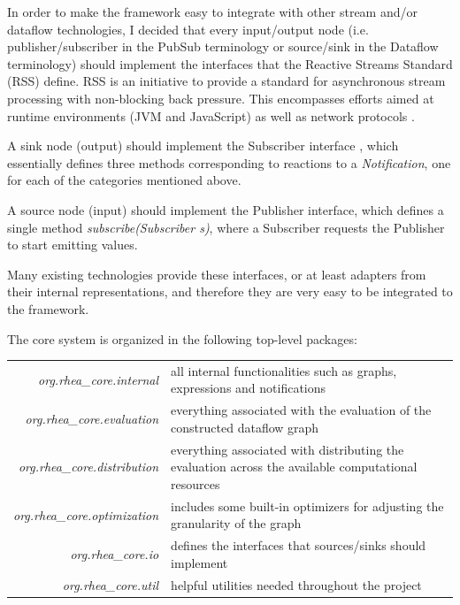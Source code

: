 \documentclass{dithesis}
\begin{document}
In order to make the framework easy to integrate with other stream and/or dataflow technologies, I decided that every input/output node (i.e. publisher/subscriber in the PubSub terminology or source/sink in the Dataflow terminology) should implement the interfaces that the Reactive Streams Standard (RSS) define. RSS is an initiative to provide a standard for asynchronous stream processing with non-blocking back pressure. This encompasses efforts aimed at runtime environments (JVM and JavaScript) as well as network protocols \cite{rss}.

A sink node (output) should implement the Subscriber interface , which essentially defines three methods corresponding to reactions to a \textit{Notification}, one for each of the categories mentioned above. 

A source node (input) should implement the Publisher interface, which defines a single method \textit{subscribe(Subscriber s)}, where a Subscriber requests the Publisher to start emitting values. 

Many existing technologies provide these interfaces, or at least adapters from their internal representations, and therefore they are very easy to be integrated to the framework.

\newpage

The core system is organized in the following top-level packages:

\begin{tabularx}{\textwidth}{rX}
	\textit{org.rhea\_core.internal} 
	& all internal functionalities such as graphs, expressions and notifications \\
	\textit{org.rhea\_core.evaluation}
	& everything associated with the evaluation of the constructed dataflow graph \\
	\textit{org.rhea\_core.distribution}
	& everything associated with distributing the evaluation across the available computational resources \\
	\textit{org.rhea\_core.optimization}	
	& includes some built-in optimizers for adjusting the  granularity of the graph \\
	\textit{org.rhea\_core.io}
	& defines the interfaces that sources/sinks should implement \\
	\textit{org.rhea\_core.util}
	& helpful utilities needed throughout the project \\
\end{tabularx}
\end{document}
